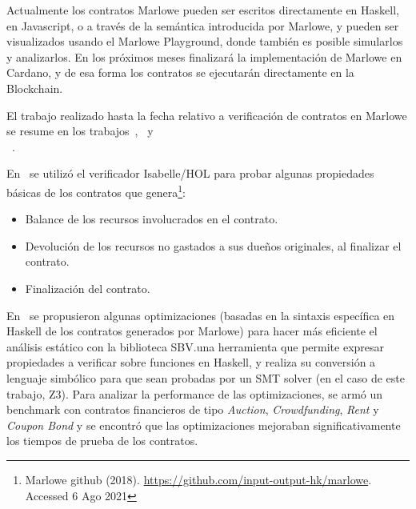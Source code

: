 \documentclass[12pt]{book}
\begin{document}
Actualmente los contratos Marlowe pueden ser escritos directamente en Haskell, en Javascript, o a través de la semántica introducida por Marlowe, y pueden ser visualizados usando el Marlowe Playground, donde también es posible simularlos y analizarlos. En los próximos meses finalizará la implementación de Marlowe en Cardano, y de esa forma los contratos se ejecutarán directamente en la Blockchain.

El trabajo realizado hasta la fecha relativo a verificación de contratos en Marlowe se resume en los trabajos~\cite{10.1007/978-3-030-03427-6_27},~\cite{10.1007/978-3-030-54455-3_35} y \\~\cite{10.1007/978-3-030-61467-6_11}.

 En~\cite{10.1007/978-3-030-54455-3_35} se utilizó el verificador Isabelle/HOL para probar algunas propiedades básicas de los contratos que genera\footnote{Marlowe github (2018). \href{https://github.com/input-output-hk/marlowe}{https://github.com/input-output-hk/marlowe}. Accessed
6 Ago 2021}:
\begin{itemize}
    \item Balance de los recursos involucrados en el contrato.
    \item Devolución de los recursos no gastados a sus dueños originales, al finalizar el contrato.
    \item Finalización del contrato.
\end{itemize}

En~\cite{10.1007/978-3-030-61467-6_11} se propusieron algunas optimizaciones (basadas en la sintaxis específica en Haskell de los contratos generados por Marlowe) para hacer más eficiente el análisis estático con la biblioteca SBV.\@SBV\@es una herramienta que permite expresar propiedades a verificar sobre funciones en Haskell, y realiza su conversión a lenguaje simbólico para que sean probadas por un SMT solver (en el caso de este trabajo, Z3). Para analizar la performance de las optimizaciones, se armó un benchmark con contratos financieros de tipo \textit{Auction}, \textit{Crowdfunding}, \textit{Rent} y \textit{Coupon Bond} y se encontró que las optimizaciones mejoraban significativamente los tiempos de prueba de los contratos.
\end{document}
